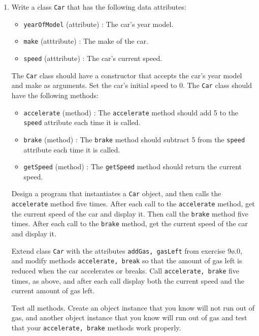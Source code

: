\documentclass[a4paper,12pt]{article}
\begin{document}
\begin{enumerate}[label=10ø.\arabic*,start=0]
 \item Write a class \texttt{Car} that has the following data attributes:
 \begin{itemize}
    \item \texttt{yearOfModel} (attribute) : The car's year model.
    \item \texttt{make} (atttribute) : The make of the car.
    \item \texttt{speed} (atttribute) : The car's current speed.
    \end{itemize}
The \texttt{Car} class should have a constructor that accepts the car's year model and make as arguments. Set the car's initial speed to 0.
The \texttt{Car} class should have the following methods:
 \begin{itemize}
    \item \texttt{accelerate} (method) : The \texttt{accelerate} method should add 5 to the \texttt{speed} attribute each time it is called.
    \item \texttt{brake} (method) : The \texttt{brake} method should subtract 5 from the \texttt{speed} attribute each time it is called.
    \item \texttt{getSpeed} (method) : The \texttt{getSpeed} method should return the current speed.
     \end{itemize}
Design a program that instantiates a \texttt{Car} object, and then calls the \texttt{accelerate} method five times. After each call to the \texttt{accelerate} method, get the current speed of the car and display it. Then call the \texttt{brake} method five times. After each call to the \texttt{brake} method, get the current speed of the car and display it.

Extend class \texttt{Car} with the attributes \texttt{addGas, gasLeft} from exercise 9ø.0, and modify methods \texttt{accelerate, break} so that the amount of gas left is reduced when the car accelerates or breaks. Call \texttt{accelerate, brake} five times, as above, and after each call display both the current speed and the current amount of gas left.

Test all methods. Create an object instance that you know will not run out of gas, and another object instance that you know will run out of gas and test that your \texttt{accelerate, brake} methods work properly.
\end{enumerate}
\end{document}

